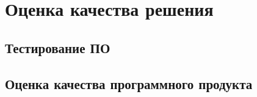 \newpage
\section{Оценка качества решения}

\subsection{Тестирование ПО}



\subsection{Оценка качества программного продукта}


